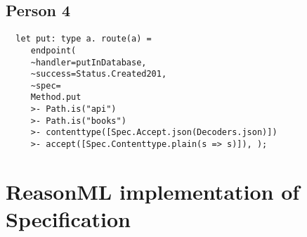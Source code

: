 \begin{appendices}
\subsection{Person 4}\label{putperson4}
\begin{lstlisting}
  let put: type a. route(a) = 
     endpoint( 
	 ~handler=putInDatabase, 
	 ~success=Status.Created201, 
   	 ~spec=
     Method.put 
	 >- Path.is("api") 
	 >- Path.is("books") 
	 >- contenttype([Spec.Accept.json(Decoders.json)]) 
	 >- accept([Spec.Contenttype.plain(s => s)]), );
\end{lstlisting}

\section{ReasonML implementation of Specification}\label{cause}


\end{appendices}

